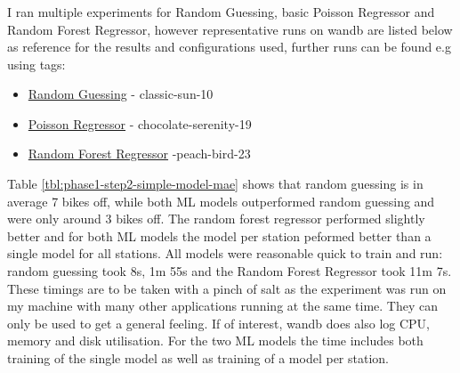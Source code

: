 \documentclass[a4paper]{article}
\begin{document}
    \subsubsection*{}

    I ran multiple experiments for Random Guessing, basic Poisson Regressor and Random Forest Regressor, however
    representative runs on wandb are listed below as reference for the results and configurations used, further runs can
    be found e.g using tags:
    \begin{itemize}
        \item \href{https://wandb.ai/idegen/mlp-2021/runs/3k64fgcw/overview?workspace=user-idegen}{Random Guessing} - classic-sun-10
        \item \href{https://wandb.ai/idegen/mlp-2021/runs/1iyx8zmh/overview?workspace=user-idegen}{Poisson Regressor} - chocolate-serenity-19
        \item \href{https://wandb.ai/idegen/mlp-2021/runs/25zvoihx/overview?workspace=user-idegen}{Random Forest Regressor} -peach-bird-23
    \end{itemize}

    Table \ref{tbl:phase1-step2-simple-model-mae} shows that random guessing is in average 7 bikes off, while both ML models
    outperformed random guessing and were only around 3 bikes off. The random forest regressor performed slightly better and
    for both ML models the model per station peformed better than a single model for all stations. All models
    were reasonable quick to train and run: random guessing took 8s, 1m 55s and the Random Forest Regressor took 11m 7s.
    These timings are to be taken with a pinch of salt as the experiment was run on my machine with many other applications
    running at the same time. They can only be used to get a general feeling. If of interest, wandb does
    also log CPU, memory and disk utilisation. For the two ML models the time includes both training of the single model
    as well as training of a model per station.
\end{document}
